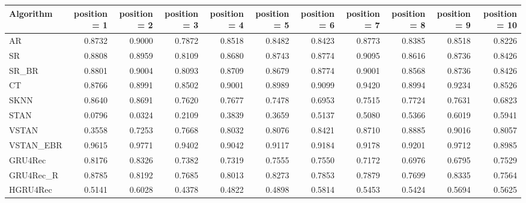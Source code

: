 \begin{tabular}{lrrrrrrrrrr}
\toprule
 Algorithm &  position = 1 &  position = 2 &  position = 3 &  position = 4 &  position = 5 &  position = 6 &  position = 7 &  position = 8 &  position = 9 &  position = 10 \\
\midrule
        AR &        0.8732 &        0.9000 &        0.7872 &        0.8518 &        0.8482 &        0.8423 &        0.8773 &        0.8385 &        0.8518 &         0.8226 \\
        SR &        0.8808 &        0.8959 &        0.8109 &        0.8680 &        0.8743 &        0.8774 &        0.9095 &        0.8616 &        0.8736 &         0.8426 \\
     SR\_BR &        0.8801 &        0.9004 &        0.8093 &        0.8709 &        0.8679 &        0.8774 &        0.9001 &        0.8568 &        0.8736 &         0.8426 \\
        CT &        0.8766 &        0.8991 &        0.8502 &        0.9001 &        0.8989 &        0.9099 &        0.9420 &        0.8994 &        0.9234 &         0.8526 \\
      SKNN &        0.8640 &        0.8691 &        0.7620 &        0.7677 &        0.7478 &        0.6953 &        0.7515 &        0.7724 &        0.7631 &         0.6823 \\
      STAN &        0.0796 &        0.0324 &        0.2109 &        0.3839 &        0.3659 &        0.5137 &        0.5080 &        0.5366 &        0.6019 &         0.5941 \\
     VSTAN &        0.3558 &        0.7253 &        0.7668 &        0.8032 &        0.8076 &        0.8421 &        0.8710 &        0.8885 &        0.9016 &         0.8057 \\
 VSTAN\_EBR &        0.9615 &        0.9771 &        0.9402 &        0.9042 &        0.9117 &        0.9184 &        0.9178 &        0.9201 &        0.9712 &         0.8985 \\
   GRU4Rec &        0.8176 &        0.8326 &        0.7382 &        0.7319 &        0.7555 &        0.7550 &        0.7172 &        0.6976 &        0.6795 &         0.7529 \\
 GRU4Rec\_R &        0.8785 &        0.8192 &        0.7685 &        0.8013 &        0.8273 &        0.7853 &        0.7879 &        0.7699 &        0.8335 &         0.7564 \\
  HGRU4Rec &        0.5141 &        0.6028 &        0.4378 &        0.4822 &        0.4898 &        0.5814 &        0.5453 &        0.5424 &        0.5694 &         0.5625 \\
\bottomrule
\end{tabular}
